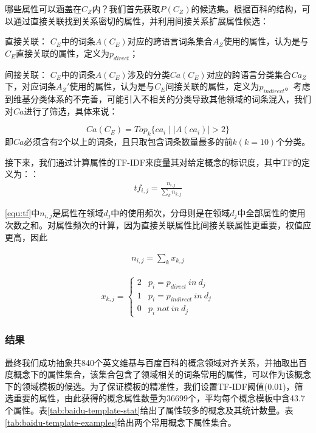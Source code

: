 哪些属性可以涵盖在$C_Z$内？我们首先获取$P(C_Z)$的候选集。根据百科的结构，可以通过直接关联找到关系密切的属性，并利用间接关系扩展属性候选：

{\heiti 直接关联：} $C_E$中的词条$A(C_E)$对应的跨语言词条集合$A_Z$使用的属性，认为是与$C_E$直接关联的属性，定义为$p_{direct}$；

{\heiti 间接关联：} $C_E$中的词条$A(C_E)$涉及的分类$Ca(C_E)$对应的跨语言分类集合$Ca_Z$下，对应词条$A_Z'$使用的属性，认为是与$C_E$间接关联的属性，定义为$p_{indirect}$。考虑到维基分类体系的不完善，可能引入不相关的分类导致其他领域的词条混入，我们对$Ca$进行了筛选，具体来说：

\begin{equation}
Ca(C_E) = Top_k\{ ca_i\mid |A(ca_i)| > 2 \}
\end{equation}
即$Ca$必须含有2个以上的词条，且只取包含词条数量最多的前$k(k=10)$个分类。

接下来，我们通过计算属性的TF-IDF来度量其对给定概念的标识度，其中TF的定义为：：
\begin{align}
\label{equ:tf}
tf_{i,j}=\frac{n_{i,j}}{\sum_{k}{n_{k,j}}}
\end{align}

\ref{equ:tf}中$n_{i,j}$是属性在领域$d_{j}$中的使用频次，分母则是在领域$d_{j}$中全部属性的使用次数之和。对属性频次的计算，因为直接关联属性比间接关联属性更重要，权值应更高，因此

\begin{align}
n_{i,j} = {\sum_{k}{x_{k,j}}}
\end{align}

\begin{align}
x_{k,j} =
\left\{\begin{matrix}
2 & p_i = p_{direct} \ in \ d_j\\
1 & p_i = p_{indirect} \ in \ d_j\\
0 & p_i \ not \ in \ d_j
\end{matrix}\right.
\end{align}

\subsubsection{结果}
最终我们成功抽象共840个英文维基与百度百科的概念领域对齐关系，并抽取出百度概念下的属性集合，该集合包含了领域相关的词条常用的属性，可以作为该概念下的领域模板的候选。为了保证模板的精准性，我们设置TF-IDF阈值(0.01)，筛选重要的属性，由此获得的概念属性数量为36699个，平均每个概念模板中含43.7个属性。表\ref{tab:baidu-template-stat}给出了属性较多的概念及其统计数量。表\ref{tab:baidu-template-examples}给出两个常用概念下属性集合。

